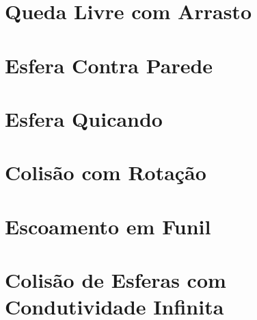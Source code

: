 \section{Queda Livre com Arrasto}
\section{Esfera Contra Parede}
\section{Esfera Quicando}
\section{Colisão com Rotação}
\section{Escoamento em Funil}
\section{Colisão de Esferas com Condutividade Infinita}